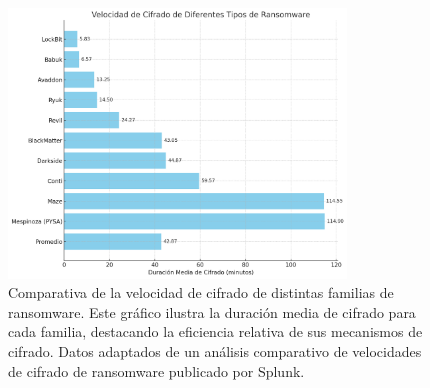 \begin{figure}[H]
    \centering
    \includegraphics[width=0.8\textwidth]{imagenes/graficos/velocidad_cifrado.png} %
    \caption{Comparativa de la velocidad de cifrado de distintas familias de ransomware. Este gráfico ilustra la duración media de cifrado para cada familia, destacando la eficiencia relativa de sus mecanismos de cifrado. Datos adaptados de un análisis comparativo de velocidades de cifrado de ransomware publicado por Splunk.\autocite{SplunkRansomwareSpeed}}
    \label{fig:mi-grafico}
\end{figure}